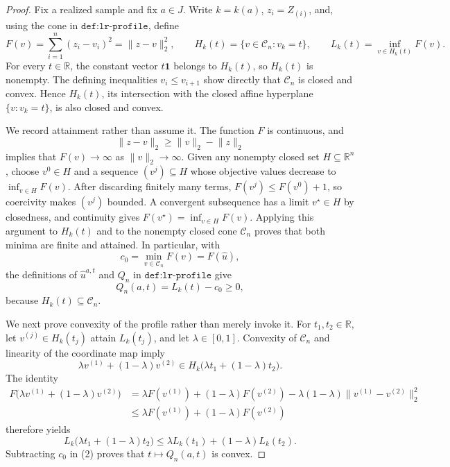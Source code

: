 \documentclass{article}
\begin{document}
\begin{proof}
Fix a realized sample and fix \(a\in J\).  Write \(k=k(a)\), \(z_i=Z_{(i)}\), and, using the cone in \(\texttt{def:lr-profile}\), define
\[
 F(v)=\sum_{i=1}^{n}(z_i-v_i)^2=\lVert z-v\rVert_2^2,
 \qquad
 H_k(t)=\{v\in\mathcal C_n:v_k=t\},
 \qquad
 L_k(t)=\inf_{v\in H_k(t)}F(v).
\]
For every \(t\in\mathbb R\), the constant vector \(t\mathbf 1\) belongs to \(H_k(t)\), so \(H_k(t)\) is nonempty.  The defining inequalities \(v_i\le v_{i+1}\) show directly that \(\mathcal C_n\) is closed and convex.  Hence \(H_k(t)\), its intersection with the closed affine hyperplane \(\{v:v_k=t\}\), is also closed and convex.

We record attainment rather than assume it.  The function \(F\) is continuous, and
\[
 \lVert z-v\rVert_2\ge \lVert v\rVert_2-\lVert z\rVert_2
\]
implies that \(F(v)\to\infty\) as \(\lVert v\rVert_2\to\infty\).  Given any nonempty closed set \(H\subseteq\mathbb R^n\), choose \(v^0\in H\) and a sequence \((v^j)\subseteq H\) whose objective values decrease to \(\inf_{v\in H}F(v)\).  After discarding finitely many terms, \(F(v^j)\le F(v^0)+1\), so coercivity makes \((v^j)\) bounded.  A convergent subsequence has a limit \(v^\star\in H\) by closedness, and continuity gives \(F(v^\star)=\inf_{v\in H}F(v)\).  Applying this argument to \(H_k(t)\) and to the nonempty closed cone \(\mathcal C_n\) proves that both minima are finite and attained.  In particular, with
\[
 c_0=\min_{v\in\mathcal C_n}F(v)=F(\widehat u),
\]
the definitions of \(\widehat u^{a,t}\) and \(Q_n\) in \(\texttt{def:lr-profile}\) give
\[
 Q_n(a,t)=L_k(t)-c_0\ge0,                                      \tag{1}
\]
because \(H_k(t)\subseteq\mathcal C_n\).

We next prove convexity of the profile rather than merely invoke it.  For \(t_1,t_2\in\mathbb R\), let \(v^{(j)}\in H_k(t_j)\) attain \(L_k(t_j)\), and let \(\lambda\in[0,1]\).  Convexity of \(\mathcal C_n\) and linearity of the coordinate map imply
\[
 \lambda v^{(1)}+(1-\lambda)v^{(2)}
 \in H_k\bigl(\lambda t_1+(1-\lambda)t_2\bigr).
\]
The identity
\[
 \begin{aligned}
 F\bigl(\lambda v^{(1)}+(1-\lambda)v^{(2)}\bigr)
 &=\lambda F(v^{(1)})+(1-\lambda)F(v^{(2)})
   -\lambda(1-\lambda)\lVert v^{(1)}-v^{(2)}\rVert_2^2\\
 &\le \lambda F(v^{(1)})+(1-\lambda)F(v^{(2)})
\end{aligned}
\]
therefore yields
\[
 L_k\bigl(\lambda t_1+(1-\lambda)t_2\bigr)
 \le \lambda L_k(t_1)+(1-\lambda)L_k(t_2).                    \tag{2}
\]
Subtracting \(c_0\) in (2) proves that \(t\mapsto Q_n(a,t)\) is convex.


\end{proof}
\end{document}

